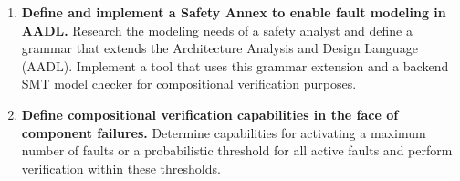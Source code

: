 \begin{enumerate}
\item \textbf{Define and implement a Safety Annex to enable fault modeling in AADL.} Research the modeling needs of a safety analyst and define a grammar that extends the Architecture Analysis and Design Language (AADL). Implement a tool that uses this grammar extension and a backend SMT model checker for compositional verification purposes.


\item \textbf{Define compositional verification capabilities in the face of component failures.} Determine capabilities for activating a maximum number of faults or a probabilistic threshold for all active faults and perform verification within these thresholds.



\end{enumerate}
